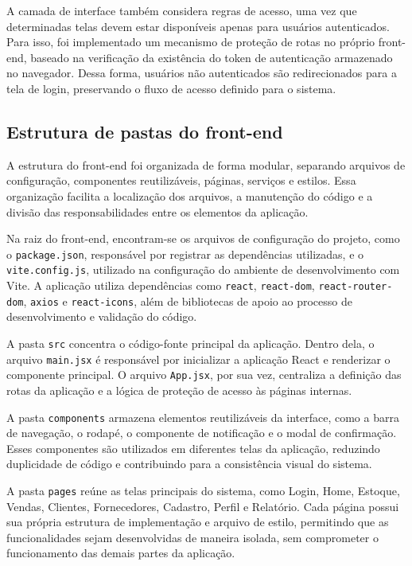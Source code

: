 A camada de interface também considera regras de acesso, uma vez que determinadas telas devem estar disponíveis apenas para usuários autenticados. Para isso, foi implementado um mecanismo de proteção de rotas no próprio front-end, baseado na verificação da existência do token de autenticação armazenado no navegador. Dessa forma, usuários não autenticados são redirecionados para a tela de login, preservando o fluxo de acesso definido para o sistema.

\subsection{Estrutura de pastas do front-end}

A estrutura do front-end foi organizada de forma modular, separando arquivos de configuração, componentes reutilizáveis, páginas, serviços e estilos. Essa organização facilita a localização dos arquivos, a manutenção do código e a divisão das responsabilidades entre os elementos da aplicação.

Na raiz do front-end, encontram-se os arquivos de configuração do projeto, como o \texttt{package.json}, responsável por registrar as dependências utilizadas, e o \texttt{vite.config.js}, utilizado na configuração do ambiente de desenvolvimento com Vite. A aplicação utiliza dependências como \texttt{react}, \texttt{react-dom}, \texttt{react-router-dom}, \texttt{axios} e \texttt{react-icons}, além de bibliotecas de apoio ao processo de desenvolvimento e validação do código.

A pasta \texttt{src} concentra o código-fonte principal da aplicação. Dentro dela, o arquivo \texttt{main.jsx} é responsável por inicializar a aplicação React e renderizar o componente principal. O arquivo \texttt{App.jsx}, por sua vez, centraliza a definição das rotas da aplicação e a lógica de proteção de acesso às páginas internas.

A pasta \texttt{components} armazena elementos reutilizáveis da interface, como a barra de navegação, o rodapé, o componente de notificação e o modal de confirmação. Esses componentes são utilizados em diferentes telas da aplicação, reduzindo duplicidade de código e contribuindo para a consistência visual do sistema.

A pasta \texttt{pages} reúne as telas principais do sistema, como Login, Home, Estoque, Vendas, Clientes, Fornecedores, Cadastro, Perfil e Relatório. Cada página possui sua própria estrutura de implementação e arquivo de estilo, permitindo que as funcionalidades sejam desenvolvidas de maneira isolada, sem comprometer o funcionamento das demais partes da aplicação.

